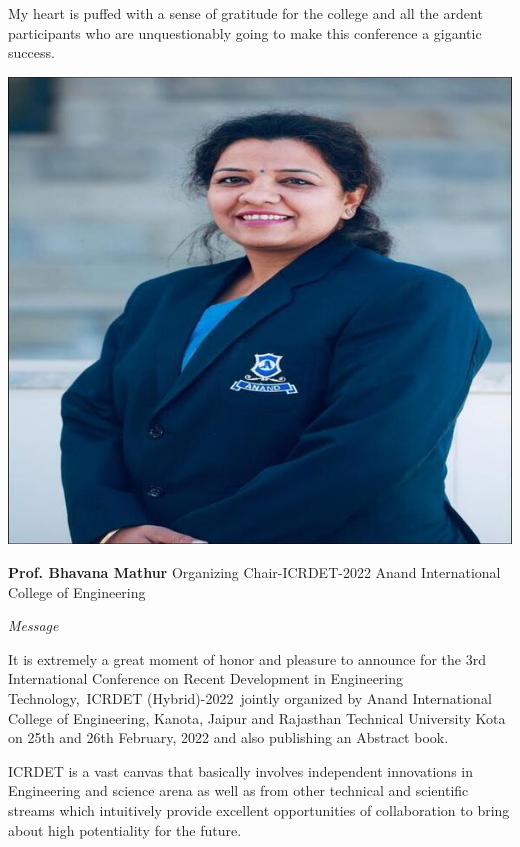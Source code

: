 \documentclass[twoside,11pt]{amsart}
\begin{document}
My heart is puffed with a sense of gratitude for the college and all the ardent participants who are unquestionably going to make this conference a gigantic success.
\newpage
\vskip 5mm
\begin{flushright}
\includegraphics[height=8\baselineskip]{BM2}
\end{flushright}
\vskip 1mm
\hfill \textbf{ Prof. Bhavana Mathur}
\vskip 1mm
\hfill Organizing Chair-ICRDET-2022
\vskip 1mm
\hfill Anand International College of Engineering
\vskip 10mm
\centerline {\huge{\emph{Message}}}
\vskip 10mm
It is extremely a great moment of honor and pleasure to announce for the 3rd International
Conference on Recent Development in Engineering Technology, ICRDET (Hybrid)-2022 jointly
organized by Anand International College of Engineering, Kanota, Jaipur and Rajasthan
Technical University Kota on 25th and 26th February, 2022 and also publishing an Abstract book.

ICRDET is a vast canvas that basically involves independent innovations in Engineering and
science arena as well as from other technical and scientific streams which intuitively provide
excellent opportunities of collaboration to bring about high potentiality for the future.
\end{document}
